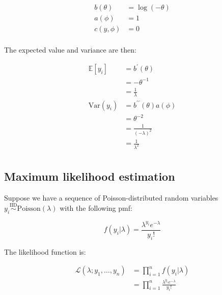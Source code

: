 \documentclass{report}
\begin{document}
\begin{equation}\label{eq:ex-glm-exponential-dist-params}
    \begin{aligned}
        b(\theta) &= \log(-\theta) \\
        a(\phi) &= 1 \\
        c(y, \phi) &= 0 \\
    \end{aligned}
\end{equation}

The expected value and variance are then:

\begin{equation}\label{eq:ex-glm-exponential-dist-mean-var}
    \begin{aligned}
        \mathbb{E}[y_i]
          &= b^\prime(\theta) \\
          &= -\theta^{-1} \\
          &= \frac{1}{\lambda} \\
        \text{Var}(y_i)
          &= b^{\prime\prime}(\theta)a(\phi) \\
          &= \theta^{-2} \\
          &= \frac{1}{(-\lambda)^2} \\
          &= \frac{1}{\lambda^2} \\
    \end{aligned}
\end{equation}

\subsection{Maximum likelihood estimation}

Suppose we have a sequence of Poisson-distributed random variables $y_i \overset{\text{IID}}{\sim} \text{Poisson}(\lambda)$ with the following \gls{pmf}:

\begin{equation}\label{eq:ex-glm-mle-poisson-dist}
    f(y_i|\lambda) = \frac{\lambda^{y_i}e^{-\lambda}}{y_i!}
\end{equation}

The likelihood function is:

\begin{equation}\label{eq:ex-glm-mle-poisson-likelihood}
    \begin{aligned}
        \mathcal{L}(\lambda;y_1, \dots, y_n) 
          &= \prod_{i=1}^n f(y_i|\lambda) \\
          &= \prod_{i=1}^n \frac{\lambda^{y_i}e^{-\lambda}}{y_i!} \\
    \end{aligned}
\end{equation}
\end{document}
